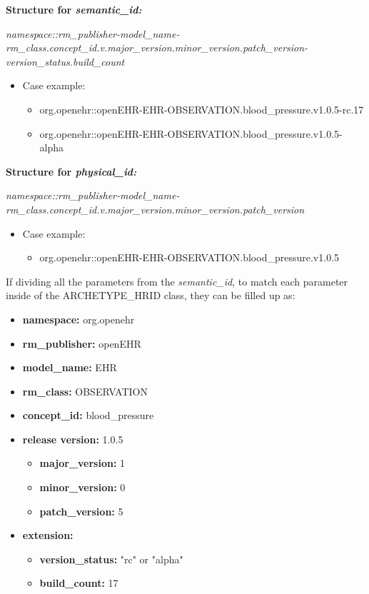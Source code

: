 \documentclass[mim_thesis.tex]{subfiles}
\begin{document}
\textbf{Structure for \textit{semantic\_id:}} 

\textit{namespace::rm\_publisher-model\_name-
rm\_class.concept\_id.v.major\_version.minor\_version.patch\_version-
version\_status.build\_count}
\begin{itemize}[noitemsep]
\item Case example:
\begin{itemize}[noitemsep]
\item org.openehr::openEHR-EHR-OBSERVATION.blood\_pressure.v1.0.5-rc.17 
\item org.openehr::openEHR-EHR-OBSERVATION.blood\_pressure.v1.0.5-alpha \\ 
\end{itemize}
\end{itemize}

\textbf{Structure for \textit{physical\_id:}} 

\textit{namespace::rm\_publisher-model\_name-
rm\_class.concept\_id.v.major\_version.minor\_version.patch\_version}
\begin{itemize}[noitemsep]
\item Case example:
\begin{itemize}[noitemsep]
\item org.openehr::openEHR-EHR-OBSERVATION.blood\_pressure.v1.0.5
\end{itemize}
\end{itemize}

If dividing all the parameters from the \textit{semantic\_id}, to match each parameter inside of the ARCHETYPE\_HRID class, they can be filled up as: 
\begin{itemize}[noitemsep]
\item \textbf{namespace:} org.openehr
\item \textbf{rm\_publisher:} openEHR
\item \textbf{model\_name:} EHR
\item \textbf{rm\_class:} OBSERVATION
\item \textbf{concept\_id:} blood\_pressure
\item \textbf{release version:} 1.0.5
\begin{itemize}
\item \textbf{major\_version:} 1
\item \textbf{minor\_version:} 0
\item \textbf{patch\_version:} 5
\end{itemize}
\item \textbf{extension:}
\begin{itemize}
\item \textbf{version\_status:} "rc" or "alpha"
\item \textbf{build\_count:} 17
\end{itemize}
\end{itemize}
\end{document}
